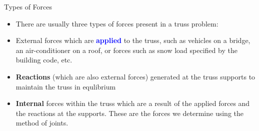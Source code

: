 \documentclass[9pt, xcolor={svgnames, x11names},professionalfonts]{beamer}
\def\scale{1}
\begin{document}
\begin{frame}{Types of Forces}
	\small\centering\vspace{0.25cm}
	\def\scale{0.75}
	
	\vspace{-0.5cm}
	\begin{itemize}
		\item [] There are usually three types of forces present in a truss problem:\pause
		\item [] External forces which are \textcolor{blue}{\bfseries applied} to the truss, such as vehicles on a bridge, an air-conditioner on a roof, or forces such as snow load specified by the building code, etc.\pause
		\item [] \textcolor{saitMaroon}{\bfseries Reactions} (which are also external forces) generated at the truss supports to maintain the truss in equlibrium\pause
		\item [] \textcolor{Green4!65!black}{\bfseries Internal} forces within the truss which are a result of the applied
		      forces and the reactions at the supports. These are the forces we determine using the method of joints.
	\end{itemize}

\end{frame}

\end{document}
